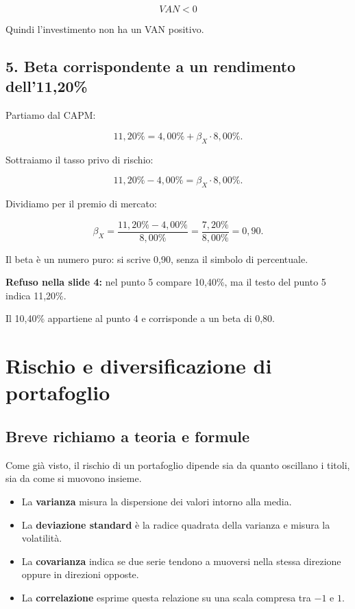 \[
\boxed{VAN<0}
\]

\noindent Quindi l'investimento
non ha un VAN positivo.


\subsection*{5. Beta corrispondente a un rendimento dell'11,20\%}

\noindent Partiamo dal CAPM:

\[
11{,}20\%
=
4{,}00\%+\beta_X\cdot8{,}00\%.
\]

\noindent Sottraiamo il tasso privo di rischio:

\[
11{,}20\%-4{,}00\%
=
\beta_X\cdot8{,}00\%.
\]

\noindent Dividiamo per il premio di mercato:

\[
\beta_X
=
\frac{11{,}20\%-4{,}00\%}{8{,}00\%}
=
\frac{7{,}20\%}{8{,}00\%}
=
\boxed{0{,}90}.
\]

\noindent Il beta è un numero puro:
si scrive 0,90, senza il simbolo di percentuale.

\noindent \textbf{Refuso nella slide 4:}
nel punto 5 compare 10,40\%,
ma il testo del punto 5 indica 11,20\%.

\noindent Il 10,40\% appartiene al punto 4
e corrisponde a un beta di 0,80.


\section{Rischio e diversificazione di portafoglio}

\subsection*{Breve richiamo a teoria e formule}

\noindent Come già visto,
il rischio di un portafoglio
dipende sia da quanto oscillano i titoli,
sia da come si muovono insieme.

\begin{itemize}
    \item La \textbf{varianza} misura
    la dispersione dei valori intorno alla media.

    \item La \textbf{deviazione standard}
    è la radice quadrata della varianza
    e misura la volatilità.

    \item La \textbf{covarianza}
    indica se due serie tendono
    a muoversi nella stessa direzione
    oppure in direzioni opposte.

    \item La \textbf{correlazione}
    esprime questa relazione
    su una scala compresa tra $-1$ e $1$.
\end{itemize}

